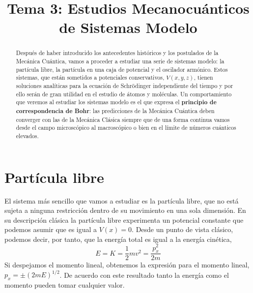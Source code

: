 \documentclass{tufte-handout}
\title[Química Física II: Tema 3 - Sistemas modelo]{
Tema 3: Estudios Mecanocuánticos de Sistemas Modelo}
\date{}  %
\begin{document}
\maketitle%

\begin{abstract}
\noindent Después de haber introducido los antecedentes históricos y los
postulados de la Mecánica Cuántica, vamos a proceder a 
estudiar una serie de sistemas modelo: la partícula libre, la
partícula en una caja de potencial y el oscilador armónico.
Estos sistemas, que están sometidos a potenciales conservativos,
$V(x,y,z)$, tienen soluciones analíticas para la ecuación 
de Schrödinger independiente del tiempo y por ello serán de gran
utilidad en el estudio de átomos y moléculas. Un comportamiento
que veremos al estudiar los sistemas modelo es el que expresa
el \textbf{principio de correspondencia de Bohr}:
las predicciones de la Mecánica Cuántica deben converger con 
las de la Mecánica Clásica siempre que de una forma continua vamos 
desde el campo microscópico al macroscópico o bien en el límite   
de números cuánticos elevados.

\end{abstract}




\section{Partícula libre}
El sistema más sencillo que vamos a estudiar es la partícula libre,
que no está sujeta a ninguna restricción dentro de su movimiento
en una sola dimensión. En su descripción clásica la partícula libre
experimenta un potencial constante que podemos asumir que es igual a
$V(x)=0$. Desde un punto de vista clásico, podemos decir, por tanto,
que la energía total es igual a la energía cinética,
\begin{equation}
    E=K=\frac{1}{2}mv^2=\frac{p_x^2}{2m}
\end{equation}
Si despejamos el momento lineal, obtenemos la expresión para el
momento lineal, $p_x=\pm(2mE)^{1/2}$. De acuerdo con este resultado
tanto la energía como el momento pueden tomar cualquier valor.
\end{document}
